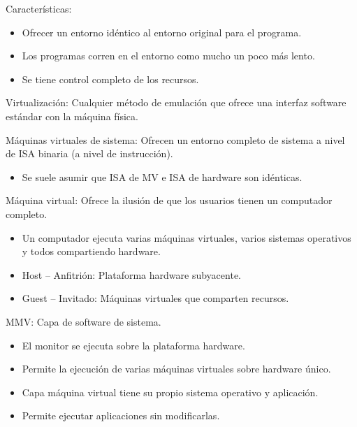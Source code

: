 \documentclass[12pt, twoside, openright]{report} %
\begin{document}
    Características:
    \vspace{-0.5cm}

    \begin{itemize}
    
    \item
      Ofrecer un entorno idéntico al entorno original para el programa.
    \item
      Los programas corren en el entorno como mucho un poco más lento.
    \item
      Se tiene control completo de los recursos.
    \end{itemize}

    Virtualización: Cualquier método de emulación que ofrece una
    interfaz software estándar con la máquina física.

    Máquinas virtuales de sistema: Ofrecen un entorno completo de
    sistema a nivel de ISA binaria (a nivel de instrucción).

    \begin{itemize}
    
    \item
      Se suele asumir que ISA de MV e ISA de hardware son idénticas.
    \end{itemize}

    Máquina virtual: Ofrece la ilusión de que los usuarios tienen un
    computador completo.
    \vspace{-0.5cm}

    \begin{itemize}
    
    \item
      Un computador ejecuta varias máquinas virtuales, varios sistemas
      operativos y todos compartiendo hardware.
    \item
      Host -- Anfitrión: Plataforma hardware subyacente.
    \item
      Guest -- Invitado: Máquinas virtuales que comparten recursos.
    \end{itemize}

    MMV: Capa de software de sistema.
\vspace{-0.5cm}
    \begin{itemize}
    
    \item
      El monitor se ejecuta sobre la plataforma hardware.
    \item
      Permite la ejecución de varias máquinas virtuales sobre hardware
      único.
    \item
      Capa máquina virtual tiene su propio sistema operativo y
      aplicación.
    \item
      Permite ejecutar aplicaciones sin modificarlas.
    \end{itemize}
\end{document}
